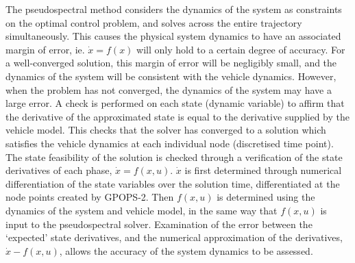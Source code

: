 The pseudospectral method considers the dynamics of the system as constraints on the optimal control problem, and solves across the entire trajectory simultaneously. This causes the physical system dynamics to have an associated margin of error, ie. $\dot{x} = f(x)$ will only hold to a certain degree of accuracy. For a well-converged solution, this margin of error will be negligibly small, and the dynamics of the system will be consistent with the vehicle dynamics. However, when the problem has not converged, the dynamics of the system may have a large error.
A check is performed on each state (dynamic variable) to affirm that the derivative of the approximated state is equal to the derivative supplied by the vehicle model. This checks that the solver has converged to a solution which satisfies the vehicle dynamics at each individual node (discretised time point). 
The state feasibility of the solution is checked through a verification of the state derivatives of each phase, $\dot{x} = f(x,u)$. $\dot{x}$ is first determined through numerical differentiation of the state variables over the solution time, differentiated at the node points created by GPOPS-2. Then $f(x,u)$ is determined using the dynamics of the system and vehicle model, in the same way that $f(x,u)$ is input to the pseudospectral solver. Examination of the error between the `expected' state derivatives, and the numerical approximation of the derivatives, $\dot{x} - f(x,u)$, allows the accuracy of the system dynamics to be assessed. 



